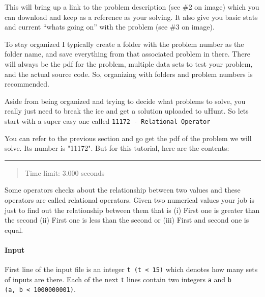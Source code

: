 
This will bring up a link to the problem description (see \#2 on image) which you can download and keep as a  reference as your solving. It also give you basic stats and current ``whats going on'' with the problem (see \#3 on image).

To stay organized I typically create a folder with the problem number as the folder name, and save everything from that associated problem in there. There will always be the pdf for the problem, multiple data sets to test your problem, and the actual source code. So, organizing with folders and problem numbers is recommended.

Aside from being organized and trying to decide what problems to solve, you really just need to break the ice and get a solution uploaded to uHunt. So lets start with a super easy one called \texttt{11172\ -\ Relational\ Operator}

\hypertarget{solving-a-problem}{%
\label{solving-a-problem}}

You can refer to the previous section and go get the pdf of the problem we will solve. Its number is "11172". But for this tutorial, here are the contents:

\begin{center}\rule{0.5\linewidth}{0.5pt}\end{center}

\hypertarget{relational-operator}{%
\label{relational-operator}}

\begin{quote}
Time limit: 3.000 seconds
\end{quote}

Some operators checks about the relationship between two values and
these operators are called relational operators. Given two numerical
values your job is just to find out the relationship between them that
is (i) First one is greater than the second (ii) First one is less than
the second or (iii) First and second one is equal.

\hypertarget{input}{%
\paragraph{Input}\label{input}}

First line of the input file is an integer
\texttt{t\ (t\ \textless{}\ 15)} which denotes how many sets of inputs
are there. Each of the next \texttt{t} lines contain two integers
\texttt{a} and \texttt{b}
\texttt{(\textbar{}a\textbar{},\ \textbar{}b\textbar{}\ \textless{}\ 1000000001)}.

